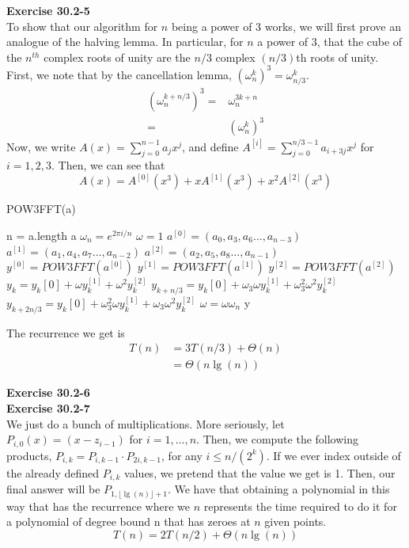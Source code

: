 \documentclass{article}
\begin{document}
\noindent\textbf{Exercise 30.2-5}\\

To show that our algorithm for $n$ being a power of $3$ works, we will first prove an analogue of the halving lemma. In particular, for $n$ a power of 3, that the cube of the $n^{th}$ complex roots of unity are the $n/3$ complex $(n/3)$th roots of unity. First, we note that by the cancellation lemma, $(\omega_{n}^k)^3 = \omega_{n/3}^k$. 
\begin{align*}
(\omega_n^{k+n/3})^3 =& \omega_n^{3k+n}\\
=&(\omega_n^k)^3
\end{align*}
Now, we write $A(x) = \sum_{j=0}^{n-1} a_jx^j$, and define $A^{[i]} = \sum_{j=0}^{n/3-1}a_{i+3j}x^j$ for $i=1,2,3$. Then, we can see that \[A(x) = A^{[0]}(x^3) + x A^{[1]}(x^3) + x^2 A^{[2]}(x^3)\]

\begin{algorithm}
\caption{POW3FFT(a)}
\begin{algorithmic}
\State n = a.length
\State \Return a
\EndIf
\State $\omega_n = e^{2\pi i/n}$
\State $\omega =1$
\State $a^{[0]} = (a_0,a_3,a_6\ldots, a_{n-3})$
\State $a^{[1]} = (a_1,a_4,a_7\ldots, a_{n-2})$
\State $a^{[2]} = (a_2,a_5,a_8\ldots, a_{n-1})$
\State $y^{[0]} = POW3FFT(a^{[0]})$
\State $y^{[1]} = POW3FFT(a^{[1]})$
\State $y^{[2]} = POW3FFT(a^{[2]})$
\State $y_k = y_k[0] +\omega y_k^{[1]} + \omega^2 y_{k}^{[2]}$
\State $y_{k+n/3} = y_k[0] +\omega_3\omega y_k^{[1]} + \omega_3^2\omega^2 y_{k}^{[2]}$
\State $y_{k+2n/3} = y_k[0] +\omega_3^2\omega y_k^{[1]} + \omega_3\omega^2 y_{k}^{[2]}$
\State $\omega = \omega \omega_n$
\EndFor
\State\Return y
\end{algorithmic}
\end{algorithm}

The recurrence we get is
\begin{align*}
T(n) &= 3 T(n/3) + \Theta(n)\\
&= \Theta(n\lg(n))
\end{align*}

\noindent\textbf{Exercise 30.2-6}\\


\noindent\textbf{Exercise 30.2-7}\\

We just do a bunch of multiplications. More seriously, let $P_{i,0}(x) = (x-z_{i-1})$ for $i=1,\ldots,n$. Then, we compute the following products, $P_{i,k} = P_{i,k-1} \cdot P_{2i,k-1}$, for any $i\le n/(2^k)$. If we ever index outside of the already defined $P_{i,k}$ values, we pretend that the value we get is 1. Then, our final answer will be $P_{1,\lfloor\lg(n)\rfloor+1}$. We have that obtaining a polynomial in this way that has the recurrence where we $n$ represents the time required to do it for a polynomial of degree bound n that has zeroes at $n$ given points.
\[
T(n) = 2T(n/2) + \Theta(n\lg(n))
\]
\end{document}
